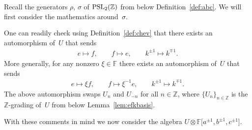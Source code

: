 \documentclass[pdftex]{sigma}
\numberwithin{equation}{section}
\begin{document}
Recall the generators $\rho$, $\sigma$
of
${\rm  {PSL}}_2(\mathbb Z)$
from
below Def\/inition~\ref{def:abc}.
We will f\/irst consider the mathematics around~$\sigma $.

One can readily check using
Def\/inition~\ref{def:chev}
that there exists an automorphism of~$U$
that sends
\begin{gather*}
e \mapsto f,  \qquad f \mapsto e,  \qquad k^{\pm 1}\mapsto k^{\mp 1}.
\end{gather*}
More generally, for any nonzero $\xi \in \mathbb F$ there exists
an automorphism of~$U$ that sends
\begin{gather*}
e \mapsto \xi f,  \qquad f \mapsto \xi^{-1}e,
\qquad k^{\pm 1}\mapsto k^{\mp 1}.
\end{gather*}
The above automorphism
swaps
$U_n$ and $U_{-n}$
for all $n \in \mathbb Z$, where
$\lbrace U_n\rbrace_{n \in \mathbb Z}$ is the
$\mathbb Z$-grading
of~$U$ from
below Lemma~\ref{lem:efkbasis}.

With these  comments in mind we
now consider the algebra
$U \otimes
\mathbb F \lbrack a^{\pm 1}, b^{\pm 1}, c^{\pm 1}\rbrack $.
\end{document}
